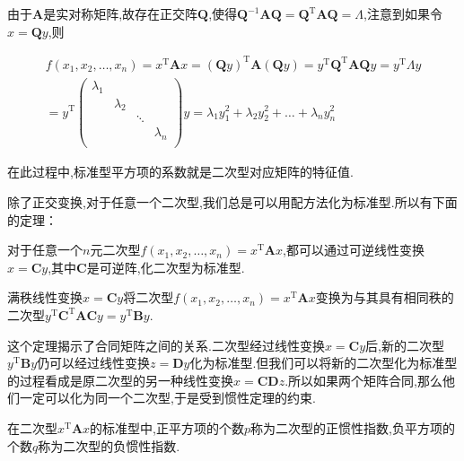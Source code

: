 由于$\mathbf{A}$是实对称矩阵,故存在正交阵$\mathbf{Q}$,使得$\mathbf{Q}^{-1}\mathbf{A}\mathbf{Q}=\mathbf{Q}^\mathrm{T}\mathbf{A}\mathbf{Q}=\varLambda $,注意到如果令$x=\mathbf{Q}y$,则

\begin{gather*}
    f(x_1,x_2,\dots,x_n)=x^\mathrm{T}\mathbf{A}x=(\mathbf{Q}y)^\mathrm{T}\mathbf{A}(\mathbf{Q}y)=y^\mathrm{T}\mathbf{Q}^\mathrm{T}\mathbf{A}\mathbf{Q}y=y^\mathrm{T}\mathbf{\varLambda}y\\
    =y^\mathrm{T}
    \begin{pmatrix}
        \lambda_1   &      &      &      \\
           &   \lambda_2   &      &      \\
           &      &   \ddots   &      \\
           &      &      &   \lambda_n   \\
    \end{pmatrix}y
    =\lambda_1y_1^2+\lambda_2y_2^2+\dots+\lambda_ny_n^2
\end{gather*}

在此过程中,标准型平方项的系数就是二次型对应矩阵的特征值.

除了正交变换,对于任意一个二次型,我们总是可以用配方法化为标准型.所以有下面的定理：

\begin{ttheorem}
    对于任意一个$n$元二次型$f(x_1,x_2,\dots,x_n)=x^\mathrm{T}\mathbf{A}x$,都可以通过可逆线性变换$x=\mathbf{C}y$,其中$\mathbf{C}$是可逆阵,化二次型为标准型.
\end{ttheorem}

\begin{ttheorem}
    满秩线性变换$x=\mathbf{C}y$将二次型$f(x_1,x_2,\dots,x_n)=x^\mathrm{T}\mathbf{A}x$变换为与其具有相同秩的二次型$y^\mathrm{T}\mathbf{C}^\mathrm{T}\mathbf{A}\mathbf{C}y=y^\mathrm{T}\mathbf{B}y$.
\end{ttheorem}

这个定理揭示了合同矩阵之间的关系.二次型经过线性变换$x=\mathbf{C}y$后,新的二次型$y^\mathrm{T}\mathbf{B}y$仍可以经过线性变换$z=\mathbf{D}y$化为标准型.但我们可以将新的二次型化为标准型的过程看成是原二次型的另一种线性变换$x=\mathbf{C}\mathbf{D}z$.所以如果两个矩阵合同,那么他们一定可以化为同一个二次型,于是受到惯性定理的约束.

\begin{definition}
    在二次型$x^\mathrm{T}\mathbf{A}x$的标准型中,正平方项的个数$p$称为二次型的正惯性指数,负平方项的个数$q$称为二次型的负惯性指数.
\end{definition}

